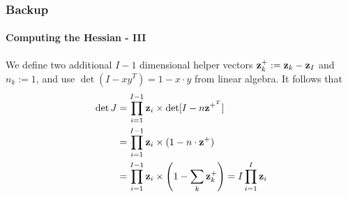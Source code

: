 \documentclass[10pt,usepdftitle=false,aspectratio=169,handout]{beamer}
\begin{document}

\begin{frame}\frametitle{Backup}
	\framesubtitle{Computing the Hessian - III}
	We define two additional $I-1$ dimensional helper vectors ${\mathbf{z}}_k^+ := {\mathbf{z}}_k - {\mathbf{z}}_I$ and $n_k := 1$, and use $\det(I - xy^T) = 1 - x \cdot y$ from linear algebra. It follows that
	\begin{align}
	\operatorname{det} J &= \prod_{i=1}^{I-1} {\mathbf{z}}_i \times \operatorname{det}[I-n{\mathbf{z}}^{+^T}]  \\
	&= \prod_{i=1}^{I-1} {\mathbf{z}}_i \times (1 - n \cdot {\mathbf{z}}^{+})  \\
	&= \prod_{i=1}^{I-1} {\mathbf{z}}_i \times \left(1 - \sum_k {\mathbf{z}}_k^{+} \right) = I \prod_{i=1}^I {\mathbf{z}}_i 
	\end{align}
	
\end{frame}



\end{document}
